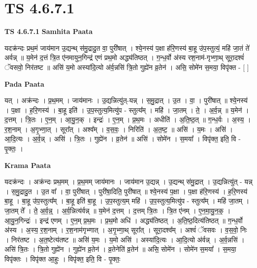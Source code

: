 \documentclass[17pt]{extarticle}
\begin{document}
\section{ TS 4.6.7.1 }

\textbf{TS 4.6.7.1 } \newline
\textbf{Samhita Paata} \newline

यदक्र॑न्दः प्रथ॒मं जाय॑मान उ॒द्यन्थ् स॑मु॒द्रादु॒त वा॒ पुरी॑षात् । श्ये॒नस्य॑ प॒क्षा ह॑रि॒णस्य॑ बा॒हू उ॑प॒स्तुत्यं॒ महि॑ जा॒तं ते॑ अर्वन्न् ॥ य॒मेन॑ द॒त्तं त्रि॒त ए॑नमायुन॒गिन्द्र॑ एणं प्रथ॒मो अद्ध्य॑तिष्ठत् । ग॒न्ध॒र्वो अ॑स्य रश॒नाम॑-गृभ्णा॒थ् सूरा॒दश्वं॑ ॅवसवो॒ निर॑तष्ट ॥ असि॑ य॒मो अस्या॑दि॒त्यो अ॑र्व॒न्नसि॑ त्रि॒तो गुह्ये॑न व्र॒तेन॑ । असि॒ सोमे॑न स॒मया॒ विपृ॑क्त - [  ] \newline

\textbf{Pada Paata} \newline

यत् । अक्र॑न्दः । प्र॒थ॒मम् । जाय॑मानः । उ॒द्यन्नित्यु॑त्-यन्न् । स॒मु॒द्रात् । उ॒त । वा॒ । पुरी॑षात् ॥ श्ये॒नस्य॑ । प॒क्षा । ह॒रि॒णस्य॑ । बा॒हू इति॑ । उ॒प॒स्तुत्य॒मित्यु॑प - स्तुत्य᳚म् । महि॑ । जा॒तम् । ते॒ । अ॒र्व॒न्न् ॥ य॒मेन॑ । द॒त्तम् । त्रि॒तः । ए॒न॒म् । आ॒यु॒न॒क् । इन्द्रः॑ । ए॒न॒म् । प्र॒थ॒मः । अधीति॑ । अ॒ति॒ष्ठ॒त् ॥ ग॒न्ध॒र्वः । अ॒स्य॒ । र॒श॒नाम् । अ॒गृ॒भ्णा॒त् । सूरा᳚त् । अश्व᳚म् । व॒स॒वः॒ । निरिति॑ । अ॒त॒ष्ट॒ ॥ असि॑ । य॒मः । असि॑ । आ॒दि॒त्यः । अ॒र्व॒न्न् । असि॑ । त्रि॒तः । गुह्ये॑न । व्र॒तेन॑ ॥ असि॑ । सोमे॑न । स॒मया᳚ । विपृ॑क्त॒ इति॒ वि - पृ॒क्तः॒ ।  \newline


\textbf{Krama Paata} \newline

यदक्र॑न्दः । अक्र॑न्दः प्रथ॒मम् । प्र॒थ॒मम् जाय॑मानः । जाय॑मान उ॒द्यन्न् । उ॒द्यन्थ् स॑मु॒द्रात् । उ॒द्यन्नित्यु॑त् - यन्न् । स॒मु॒द्रादु॒त । उ॒त वा᳚ । वा॒ पुरी॑षात् । पुरी॑षा॒दिति॒ पुरी॑षात् ॥ श्ये॒नस्य॑ प॒क्षा । प॒क्षा ह॑रि॒णस्य॑ । ह॒रि॒णस्य॑ बा॒हू । बा॒हू उ॑प॒स्तुत्य᳚म् । बा॒हू इति॑ बा॒हू । उ॒प॒स्तुत्य॒म् महि॑ । उ॒प॒स्तुत्य॒मित्यु॑प - स्तुत्य᳚म् । महि॑ जा॒तम् । जा॒तम् ते᳚ । ते॒ अ॒र्व॒न्न्॒ । अ॒र्व॒न्नित्य॑र्वन्न् ॥ य॒मेन॑ द॒त्तम् । द॒त्तम् त्रि॒तः । त्रि॒त ए॑नम् । ए॒न॒मा॒यु॒न॒क्॒ । आ॒यु॒न॒गिन्द्रः॑ । इन्द्र॑ एणम् । ए॒न॒म् प्र॒थ॒मः । प्र॒थ॒मो अधि॑ । अद्ध्य॑तिष्ठत् । अ॒ति॒ष्ठ॒दित्य॑तिष्ठत् ॥ ग॒न्ध॒र्वो अ॑स्य । अ॒स्य॒ र॒श॒नाम् । र॒श॒नाम॑गृभ्णात् । अ॒गृ॒भ्णा॒थ् सूरा᳚त् । सूरा॒दश्व᳚म् । अश्वं॑ ॅवसवः । व॒स॒वो॒ निः । निर॑तष्ट । अ॒त॒ष्टेत्य॑तष्ट ॥ असि॑ य॒मः । य॒मो असि॑ । अस्या॑दि॒त्यः । आ॒दि॒त्यो अ॑र्वन्न् । अ॒र्व॒न्नसि॑ । असि॑ त्रि॒तः । त्रि॒तो गुह्ये॑न । गुह्ये॑न व्र॒तेन॑ । व्र॒तेनेति॑ व्र॒तेन॑ ॥ असि॒ सोमे॑न । सोमे॑न स॒मया᳚ । स॒मया॒ विपृ॑क्तः । विपृ॑क्त आ॒हुः । विपृ॑क्त॒ इति॒ वि - पृ॒क्तः॒ \newline
\end{document}
